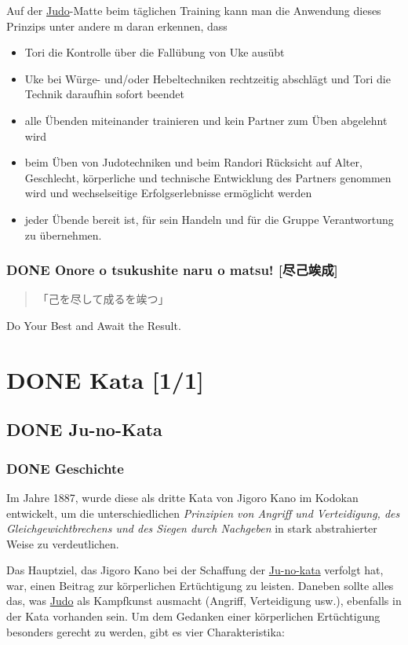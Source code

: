 \documentclass[11pt]{article}
\begin{document}
Auf der \hyperref[org5f8b831]{Judo}-Matte beim täglichen Training kann man die Anwendung dieses Prinzips unter andere
m daran erkennen, dass 
\begin{itemize}
\item Tori die Kontrolle über die Fallübung von Uke ausübt
\item Uke bei Würge- und/oder Hebeltechniken rechtzeitig abschlägt und Tori die Technik daraufhin sofort beendet
\item alle Übenden miteinander trainieren und kein Partner zum Üben abgelehnt wird
\item beim Üben von Judotechniken und beim Randori Rücksicht auf Alter, Geschlecht, körperliche und technische  Entwicklung des Partners genommen wird und wechselseitige Erfolgserlebnisse ermöglicht werden
\item jeder Übende bereit ist, für sein Handeln und für die Gruppe Verantwortung zu übernehmen.
\end{itemize}

\subsubsection{{\bfseries\sffamily DONE} Onore o tsukushite naru o matsu! [尽己竢成]}
\label{sec:org2d327a2}
\begin{quote}
「己を尽して成るを竢つ」
\end{quote}

Do Your Best and Await the Result.

\section{{\bfseries\sffamily DONE} Kata [1/1]}
\label{sec:orgaae60b6}
\subsection{{\bfseries\sffamily DONE} \label{org0f6a64a}Ju-no-Kata}
\label{sec:org9b4b895}
\subsubsection{{\bfseries\sffamily DONE} Geschichte}
\label{sec:org707d38f}
Im Jahre 1887, wurde diese als dritte Kata von Jigoro Kano im Kodokan entwickelt, um die unterschiedlichen \emph{Prinzipien von Angriff und Verteidigung, des Gleichgewichtbrechens und des Siegen durch Nachgeben} in stark abstrahierter Weise zu verdeutlichen. 

Das Hauptziel, das Jigoro Kano bei der Schaffung der \hyperref[org0f6a64a]{Ju-no-kata} verfolgt hat, war, einen Beitrag zur körperlichen Ertüchtigung zu leisten. 
Daneben sollte alles das, was \hyperref[org5f8b831]{Judo} als Kampfkunst ausmacht (Angriff, Verteidigung usw.), ebenfalls in der Kata vorhanden sein. 
Um dem Gedanken einer körperlichen Ertüchtigung besonders gerecht zu werden, gibt es vier Charakteristika:
\end{document}
